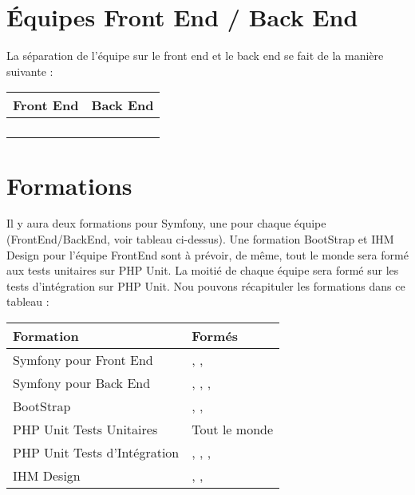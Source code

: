 \documentclass [a4paper] {article}
\begin{document}
\section{Équipes Front End / Back End}
La séparation de l'équipe sur le front end et le back end se fait de la manière suivante : \\
	\begin{tabular}{| p{5cm} | p{5cm} |}
		\hline
		\rowcolor{Gray}
		Front End & Back End		 \\
		\hline
		\Matthieu & \Florian \\
		\Mathieu & \Kafui \\
		\Julie & \Michel \\
		 & \Melissa \\
		\hline
	\end{tabular}


\section{Formations}
Il y aura deux formations pour Symfony, une pour chaque équipe (FrontEnd/BackEnd, voir tableau ci-dessus). Une formation BootStrap et IHM Design pour l'équipe FrontEnd sont à prévoir, de même, tout le monde sera formé aux tests unitaires sur PHP Unit. La moitié de chaque équipe sera formé sur les tests d'intégration sur PHP Unit. Nou pouvons récapituler les formations dans ce tableau : \\
\begin{tabular}{| p{5cm} | p{5cm} |}
		\hline
		\rowcolor{Gray}
		Formation & Formés		 \\
		\hline
		Symfony pour Front End & \Matthieu, \Mathieu, \Julie \\ \hline
		Symfony pour Back End & \Kafui, \Florian, \Michel, \Melissa \\ \hline
		BootStrap & \Matthieu, \Mathieu, \Julie \\ \hline
		PHP Unit Tests Unitaires & Tout le monde \\ \hline
		PHP Unit Tests d'Intégration & \Michel, \Florian, \Kafui, \Matthieu \\ \hline
		IHM Design & \Matthieu, \Mathieu, \Julie \\ \hline
	\end{tabular}
\end{document}
